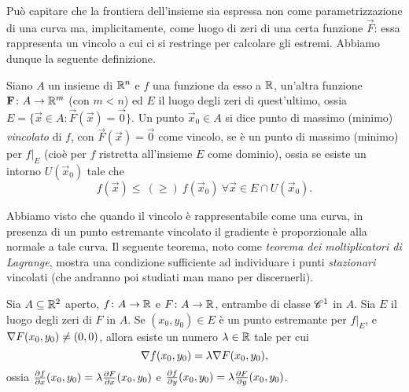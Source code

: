 Può capitare che la frontiera dell'insieme sia espressa non come parametrizzazione di una curva ma, implicitamente, come luogo di zeri di una certa funzione $\vec F$: essa rappresenta un vincolo a cui ci si restringe per calcolare gli estremi.
Abbiamo dunque la seguente definizione.
\begin{definizione} \label{d:estremi-vincolati}
	Siano $A$ un insieme di $\R^n$ e $f$ una funzione da esso a $\R$, un'altra funzione $\vec F\colon A\to\R^m$ (con $m<n$) ed $E$ il luogo degli zeri di quest'ultimo, ossia $E=\{\vec x\in A\colon \vec F(\vec x)=\vec 0\}$.
	Un punto $\vec x_0\in A$ si dice punto di massimo (minimo) \emph{vincolato} di $f$, con $\vec F(\vec x)=\vec 0$ come vincolo, se è un punto di massimo (minimo) per $f|_E$ (cioè per $f$ ristretta all'insieme $E$ come dominio), ossia se esiste un intorno $U(\vec x_0)$ tale che
	\begin{equation*}
		f(\vec x)\leq\ (\geq)\ f(\vec x_0)\ \forall\vec x\in E\cap U(\vec x_0).
	\end{equation*}
\end{definizione}
Abbiamo visto che quando il vincolo è rappresentabile come una curva, in presenza di un punto estremante vincolato il gradiente è proporzionale alla normale a tale curva.
Il seguente teorema, noto come \emph{teorema dei moltiplicatori di Lagrange}, mostra una condizione sufficiente ad individuare i punti \emph{stazionari} vincolati (che andranno poi studiati man mano per discernerli).
\begin{teorema}[Lagrange] \label{t:moltiplicatori-lagrange-R2}
	Sia $A\subseteq\R^2$ aperto, $f\colon A\to\R$ e $F\colon A\to\R$, entrambe di classe $\cclass[1]$ in $A$. Sia $E$ il luogo degli zeri di $F$ in $A$. Se $(x_0,y_0)\in E$ è un punto estremante per $f|_E$, e $\grad F(x_0,y_0)\neq(0,0)$, allora esiste un numero $\lambda\in\R$ tale per cui
	\begin{equation} 
		\grad f(x_0,y_0)=\lambda\grad F(x_0,y_0),
		\label{eq:moltiplicatori-lagrange-R2}
	\end{equation}
	ossia $\drp{f}{x}(x_0,y_0)=\lambda\drp{F}{x}(x_0,y_0)$ e $\drp{f}{y}(x_0,y_0)=\lambda\drp{F}{y}(x_0,y_0)$.
\end{teorema}
